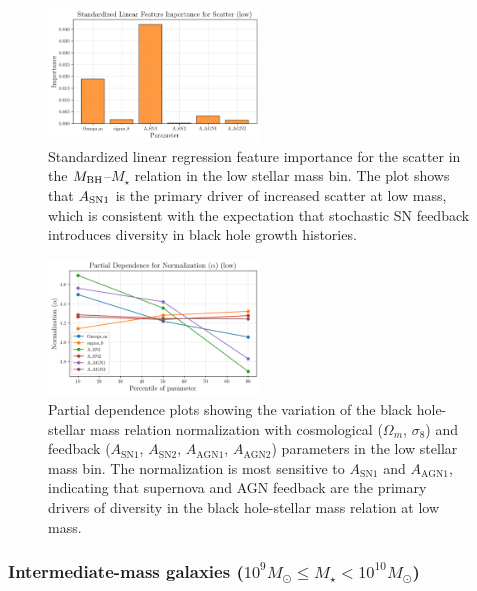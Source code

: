 \documentclass[twocolumn]{aastex631}
\begin{document}
\begin{figure}[ht!]
    \centering
    \includegraphics[width=0.5\textwidth]{../Project5/plots/featimp_StandardizedLinear_Scatter_low_34_20250423_182540.png}
    \caption{Standardized linear regression feature importance for the scatter in the $M_{\rm BH}$–$M_{\star}$ relation in the low stellar mass bin. The plot shows that $A_{\rm SN1}$ is the primary driver of increased scatter at low mass, which is consistent with the expectation that stochastic SN feedback introduces diversity in black hole growth histories.
}
    \label{fig:featimp_scatter_low}
\end{figure}

\begin{figure}[ht!]
    \centering
    \includegraphics[width=0.5\textwidth]{../Project5/plots/pdp_Normalization_alpha_low_32_20250423_182539.png}
    \caption{Partial dependence plots showing the variation of the black hole-stellar mass relation normalization with cosmological ($\Omega_m$, $\sigma_8$) and feedback ($A_\mathrm{SN1}$, $A_\mathrm{SN2}$, $A_\mathrm{AGN1}$, $A_\mathrm{AGN2}$) parameters in the low stellar mass bin. The normalization is most sensitive to $A_\mathrm{SN1}$ and $A_\mathrm{AGN1}$, indicating that supernova and AGN feedback are the primary drivers of diversity in the black hole-stellar mass relation at low mass.
}
    \label{fig:pdp_norm_low}
\end{figure}

\subsubsection{Intermediate-mass galaxies ($10^9 M_{\odot} \leq M_{\star} < 10^{10} M_{\odot}$)}
\end{document}
